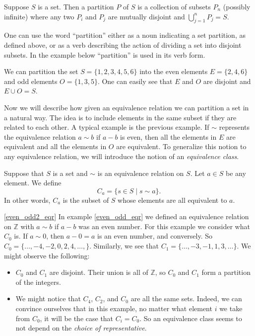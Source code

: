 \begin{definition}
Suppose $S$ is a set. Then a partition $P$ of $S$ is a collection of subsets $P_n$ (possibly infinite) where any two $P_i$ and $P_j$ are mutually disjoint and $\bigcup_{j = 1}^nP_j = S$. 
\end{definition}

One can use the word ``partition'' either as a noun indicating a set partition, as defined above, or as a verb describing the action of dividing a set into disjoint subsets. In the example below ``partition'' is used in its verb form.

\begin{example}
We can partition the set $S = \{1, 2, 3, 4, 5, 6\}$ into the even elements $E = \{2, 4, 6\}$ and odd elements $O = \{1, 3, 5\}$. One can easily see that $E$ and $O$ are disjoint and $E \cup O = S$.
\end{example}

Now we will describe how given an equivalence relation we can partition a set in a natural way. The idea is to include elements in the same subset if they are related to each other. A typical example is the previous example. If $\sim$ represents the equivalence relation $a \sim b$ if $a - b$ is even, then all the elements in $E$ are equivalent and all the elements in $O$ are equivalent. To generalize this notion to any equivalence relation, we will introduce the notion of an \textit{equivalence class}.

\begin{definition}
Suppose that $S$ is a set and $\sim$ is an equivalence relation on $S$. Let $a \in S$ be any element. We define 
\[C_a = \{s \in S \mid s \sim a\}.\]
In other words, $C_a$ is the subset of $S$ whose elements are all equivalent to $a$.
\end{definition}

\begin{example}\ref{even_odd2_eqr}
In example \ref{even_odd_eqr} we defined an equivalence relation on $\mathbb{Z}$ with $a \sim b$ if $a - b$ was an even number. For this example we consider what $C_0$ is. If $a \sim 0$, then $a - 0 = a$ is an even number, and conversely. So $C_0 = \{\dots,-4, -2, 0, 2, 4, \dots,\}$. Similarly, we see that $C_1 = \{\dots,-3, -1, 1, 3, \dots\}$. We might observe the following:
\begin{itemize}
	\item $C_0$ and $C_1$ are disjoint. Their union is all of $\mathbb{Z}$, so $C_0$ and $C_1$ form a partition of the integers.
	\item We might notice that $C_4$, $C_2$, and $C_0$ are all the same sets. Indeed, we can convince ourselves that in this example, no matter what element $i$ we take from $C_0$, it will be the case that $C_i = C_0$. So an equivalence class seems to not depend on the \textit{choice of representative}.
\end{itemize}
\end{example}

